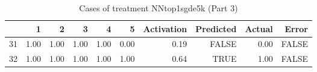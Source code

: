 \begin{table}[ht]
\centering
\begin{tabular}{rrrrrrrrrr}
  \hline
 & 1 & 2 & 3 & 4 & 5 & Activation & Predicted & Actual & Error \\ 
  \hline
31 & 1.00 & 1.00 & 1.00 & 1.00 & 0.00 & 0.19 & FALSE & 0.00 & FALSE \\ 
  32 & 1.00 & 1.00 & 1.00 & 1.00 & 1.00 & 0.64 & TRUE & 1.00 & FALSE \\ 
   \hline
\end{tabular}
\caption{Cases of treatment NNtop1sgde5k (Part 3)} 
\end{table}

